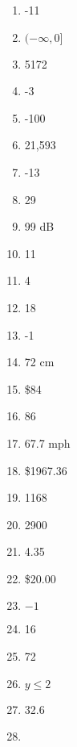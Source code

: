 \documentclass[../uilmath.tex]{subfiles}
\begin{document}
\begin{enumerate}[label=\bfseries\arabic*.]
    \item %
    -11

    \item %
    $(-\infty, 0]$

    \item %
    5172

    \item %
    -3

    \item %
    -100

    \item %
    21,593

    \item %
    -13

    \item %
    29

    \item %
    99 dB

    \item %
    11
    
    \item %
    4

    \item %
    18

    \item %
    -1

    \item %
    72 cm 

    \item %
    \$84 

    \item %
    86

    \item %
    67.7 mph 

    \item %
    \$1967.36

    \item %
    1168

    \item %
    2900

    \item %
    4.35

    \item %
    \$20.00

    \item %
    $-1$

    \item %
    16

    \item %
    72

    \item %
    $y\leq 2$

    \item %
    32.6

    \item %
    
\end{enumerate}
\end{document}
